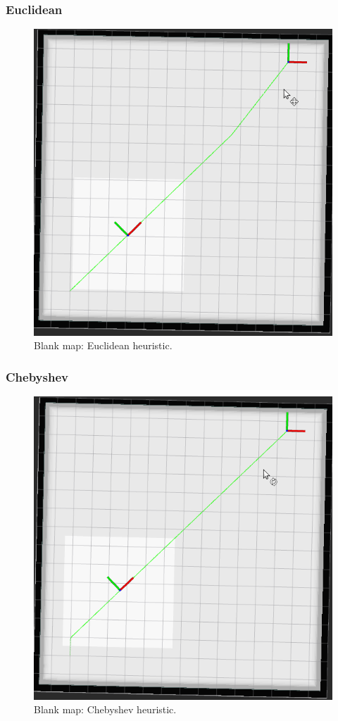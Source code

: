 \documentclass{article}
\begin{document}
\subsubsection*{Euclidean}
\begin{figure}[!ht]
    \centering
    \includegraphics[width=0.9\columnwidth]{../images/euclidean_blank.png}
    \caption{Blank map: Euclidean heuristic.}
    \label{fig:euclidean_blank}
\end{figure}
\clearpage

\subsubsection*{Chebyshev}
\begin{figure}[!ht]
    \centering
    \includegraphics[width=0.9\columnwidth]{../images/chebyshev_blank.png}
    \caption{Blank map: Chebyshev heuristic.}
    \label{fig:chebyshev_blank}
\end{figure}
\end{document}
